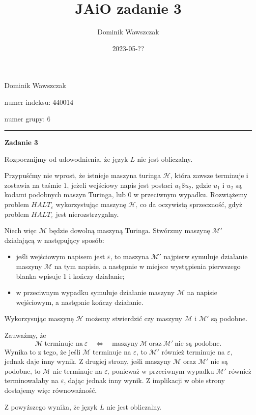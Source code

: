 \documentclass[12pt]{article}
\title{JAiO zadanie 3}
\author{Dominik Wawszczak}
\date{2023-05-??}
\begin{document}
	\setlength{\parindent}{0 cm}
	
	Dominik Wawszczak
	
	numer indeksu: 440014
	
	numer grupy: 6
	
	\bigskip
	\hrule
	\bigskip
	
	\textbf{Zadanie 3}
	
	\medskip
	
	Rozpocznijmy od udowodnienia, że język \(L\) nie jest obliczalny.
	
	\medskip
	
	Przypuśćmy nie wprost, że istnieje maszyna turinga \(\mathcal{H}\), która
	zawsze terminuje i zostawia na taśmie \(1\), jeżeli wejściowy napis jest
	postaci \(u_1 \$ u_2\), gdzie \(u_1\) i \(u_2\) są kodami podobnych maszyn
	Turinga, lub \(0\) w przeciwnym wypadku. Rozwiążemy problem
	\(HALT_{\varepsilon}\) wykorzystując maszynę \(\mathcal{H}\), co da
	oczywistą sprzeczność, gdyż problem \(HALT_{\varepsilon}\) jest
	nierozstrzygalny.
	
	\medskip
	
	Niech więc \(\mathcal{M}\) będzie dowolną maszyną Turinga. Stwórzmy maszynę
	\(\mathcal{M}'\) działającą w następujący sposób:
	\begin{itemize}
		\item jeśli wejściowym napisem jest \(\varepsilon\), to maszyna
		      \(\mathcal{M}'\) najpierw symuluje działanie maszyny
		      \(\mathcal{M}\) na tym napisie, a następnie w miejsce wystąpienia
		      pierwszego blanka wpisuje \(1\) i kończy działanie;
		\item w przeciwnym wypadku symuluje działanie maszyny \(\mathcal{M}\) na
		      napisie wejściowym, a następnie kończy działanie.
	\end{itemize}
	Wykorzysując maszynę \(\mathcal{H}\) możemy stwierdzić czy maszyny
	\(\mathcal{M}\) i \(\mathcal{M}'\) są podobne.
	
	\medskip
	
	Zauważmy, że
	\[ \mathcal{M} \ \text{terminuje na} \ \varepsilon \quad \iff \quad
	\text{maszyny} \ \mathcal{M} \ \text{oraz} \ \mathcal{M}' \ \text{nie są
	podobne.} \]
	Wynika to z tego, że jeśli \(\mathcal{M}\) terminuje na \(\varepsilon\),
	to \(\mathcal{M}'\) również terminuje na \(\varepsilon\), jednak daje inny
	wynik. Z drugiej strony, jeśli maszyny \(\mathcal{M}\) oraz
	\(\mathcal{M}'\) nie są podobne, to \(\mathcal{M}\) nie terminuje na
	\(\varepsilon\), ponieważ w przeciwnym wypadku \(\mathcal{M}'\) również
	terminowałaby na \(\varepsilon\), dając jednak inny wynik. Z implikacji w
	obie strony dostajemy więc równoważność.
	
	\medskip
	
	Z powyższego wynika, że język \(L\) nie jest obliczalny.
\end{document}
